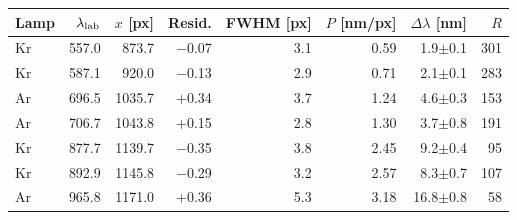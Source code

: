 \begin{tabular}{@{}lrrrrrrr@{}}
\toprule
Lamp & $\lambda_{\rm lab}$ & $x$ [px] & Resid. & FWHM [px] & $P$ [nm/px] & $\Delta\lambda$ [nm] & $R$ \\
\midrule
Kr & 557.0 & 873.7 & $-$0.07 & 3.1 & 0.59 & 1.9$\pm$0.1 & 301 \\
Kr & 587.1 & 920.0 & $-$0.13 & 2.9 & 0.71 & 2.1$\pm$0.1 & 283 \\
Ar & 696.5 & 1035.7 & +0.34 & 3.7 & 1.24 & 4.6$\pm$0.3 & 153 \\
Ar & 706.7 & 1043.8 & +0.15 & 2.8 & 1.30 & 3.7$\pm$0.8 & 191 \\
Kr & 877.7 & 1139.7 & $-$0.35 & 3.8 & 2.45 & 9.2$\pm$0.4 & 95 \\
Kr & 892.9 & 1145.8 & $-$0.29 & 3.2 & 2.57 & 8.3$\pm$0.7 & 107 \\
Ar & 965.8 & 1171.0 & +0.36 & 5.3 & 3.18 & 16.8$\pm$0.8 & 58 \\
\bottomrule
\end{tabular}
